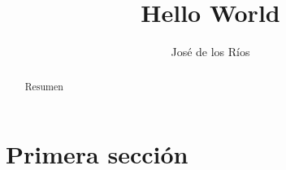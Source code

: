 \documentclass[]{article}
\title{Hello World}
\author{José de los Ríos}
\begin{document}
\maketitle

\begin{abstract}
Resumen
\end{abstract}

\section{Primera sección}
\end{document}

